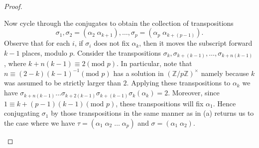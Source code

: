 \documentclass[10pt]{amsart}
\begin{document}
\begin{ex2}
\begin{proof}
\begin{enumerate}[(a)]
      Now cycle through the conjugates to obtain the collection of transpositions $$\sigma_1, \sigma_2 = (\alpha_2\; \alpha_{k+1}), \ldots, \sigma_{p} = (\alpha_p\; \alpha_{k + (p-1)}).$$
      Observe that for each $i$, if $\sigma_i$ does not fix $\alpha_k$, then it moves the subscript forward $k - 1$ places, modulo $p$.
      Consider the transpositions $\sigma_k, \sigma_{k + (k-1)}, \ldots, \sigma_{k + n(k-1)}$, where $k + n(k-1) \equiv 2 (\text{mod } p)$.
      In particular, note that $n \equiv (2-k)(k-1)^{-1} (\text{mod } p)$ has a solution in $(\mathbb{Z}/p\mathbb{Z})^\times$ namely because $k$ was assumed to be strictly larger than $2$.
      Applying these transpositions to $\alpha_k$ we have $\sigma_{k + n(k-1)} \ldots \sigma_{k + 2(k-1)} \sigma_{k + (k-1)} \sigma_k(\alpha_k) = 2$.
      Moreover, since $1 \equiv k + (p-1)(k-1) (\text{mod } p)$, these transpositions will fix $\alpha_1$.
	  Hence conjugating $\sigma_1$ by those transpositions in the same manner as in (a) returns us to the case where we have $\tau = (\alpha_1\; \alpha_2\; \ldots\; \alpha_p)$ and $\sigma = (\alpha_1\; \alpha_2)$.
    \end{enumerate}
  \end{proof}
\end{ex2}
\end{document}
